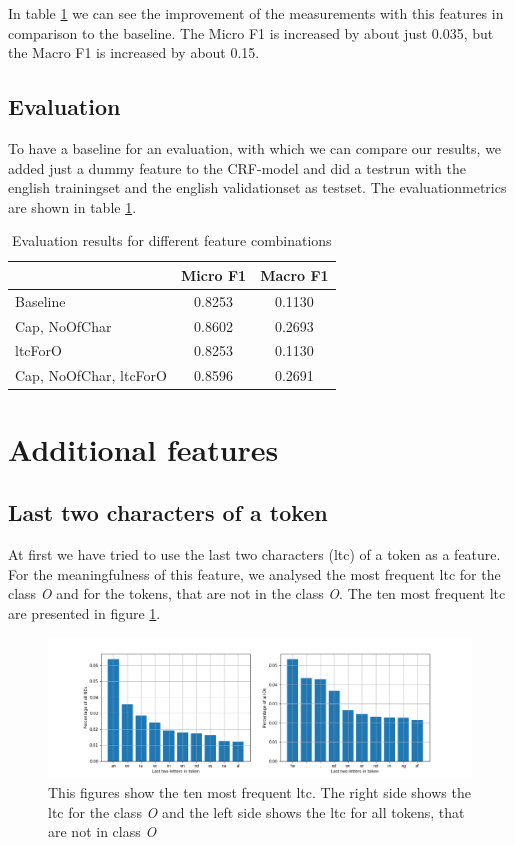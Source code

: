 \documentclass[noindent, nochapname]{tudexercise}
\begin{document}
		In table \ref{tab:results} we can see the improvement of the measurements with this features in comparison to the baseline. The Micro F1 is increased by about just 0.035, but the Macro F1 is increased by about 0.15.
		
		\subsection{Evaluation}
			To have a baseline for an evaluation, with which we can compare our results, we added just a dummy feature to the CRF-model and did a testrun with the english trainingset and the english validationset as testset. The evaluationmetrics are shown in table \ref{tab:results}.
			
			\begin{table}[h]
				\centering
				\caption{Evaluation results for different feature combinations}
				\label{tab:results}
				\begin{tabular}{lcc}
					\toprule
& \textbf{Micro F1} & \textbf{Macro F1}\\
					\midrule
Baseline & 0.8253 & 0.1130\\
Cap, NoOfChar & 0.8602 & 0.2693\\
ltcForO & 0.8253 & 0.1130\\
Cap, NoOfChar, ltcForO & 0.8596 & 0.2691\\
					\bottomrule
				\end{tabular}
			\end{table}
	
	\section{Additional features}
		\subsection{Last two characters of a token}
			At first we have tried to use the last two characters (ltc) of a token as a feature. For the meaningfulness of this feature, we analysed the most frequent ltc for the class \textit{O} and for the tokens, that are not in the class \textit{O}. The ten most frequent ltc are presented in figure \ref{fig:ten_most_frequent_ltc}.
			
			\begin{figure}[h]
				\centering
				\includegraphics[scale=0.5]{img/last_two_letters_per_class.png}
				\caption{This figures show the ten most frequent ltc. The right side shows the ltc for the class \textit{O} and the left side shows the ltc for all tokens, that are not in class \textit{O}}
				\label{fig:ten_most_frequent_ltc}
			\end{figure}
			
\end{document}
